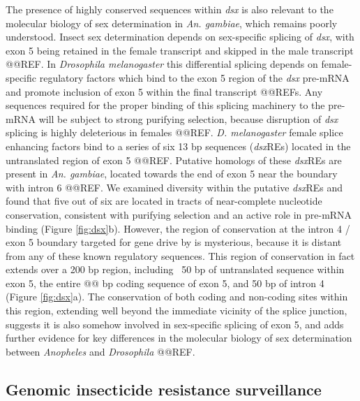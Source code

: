\documentclass[a4paper,11pt,abstracton,hidelinks]{scrartcl}
\begin{document}
The presence of highly conserved sequences within \textit{dsx} is also relevant to the molecular biology of sex determination in \textit{An. gambiae}, which remains poorly understood.
%
Insect sex determination depends on sex-specific splicing of \textit{dsx}, with exon 5 being retained in the female transcript and skipped in the male transcript @@REF.
%
In \textit{Drosophila melanogaster} this differential splicing depends on female-specific regulatory factors which bind to the exon 5 region of the \textit{dsx} pre-mRNA and promote inclusion of exon 5 within the final transcript @@REFs.
%
Any sequences required for the proper binding of this splicing machinery to the pre-mRNA will be subject to strong purifying selection, because disruption of \textit{dsx} splicing is highly deleterious in females @@REF. 
%
\textit{D. melanogaster} female splice enhancing factors bind to a series of six 13 bp sequences (\textit{dsx}REs) located in the untranslated region of exon 5 @@REF.
%
Putative homologs of these \textit{dsx}REs are present in \textit{An. gambiae},  located towards the end of exon 5 near the boundary with intron 6 @@REF.
%
We examined diversity within the putative \textit{dsx}REs and found that five out of six are located in tracts of near-complete nucleotide conservation, consistent with purifying selection and an active role in pre-mRNA binding (Figure \ref{fig:dsx}b).
%
However, the region of conservation at the intron 4 / exon 5 boundary targeted for gene drive by \cite{kyrou2018} is mysterious, because it is distant from any of these known regulatory sequences.
%
This region of conservation in fact extends over a 200 bp region, including ~50 bp of untranslated sequence within exon 5, the entire @@ bp coding sequence of exon 5, and 50 bp of intron 4 (Figure \ref{fig:dsx}a).
%
The conservation of both coding and non-coding sites within this region, extending well beyond the immediate vicinity of the splice junction, suggests it is also somehow involved in sex-specific splicing of exon 5, and adds further evidence for key differences in the molecular biology of sex determination between \textit{Anopheles} and \textit{Drosophila} @@REF. 
%


\subsection*{Genomic insecticide resistance surveillance}
\end{document}
